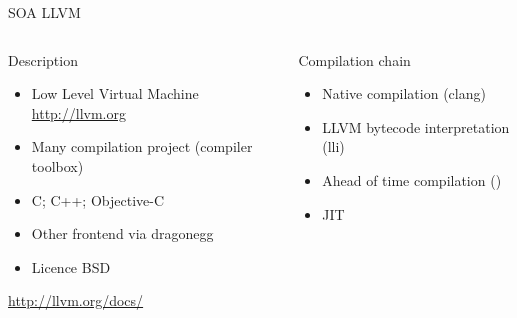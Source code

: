 %
\begin{Frame}{SOA LLVM}
  \begin{columns}[t]
    \begin{column}{\BW} %
      \begin{block}{Description}
        \begin{itemize}
        \item Low Level Virtual Machine \url{http://llvm.org}
        \item Many compilation project (compiler toolbox)
        \item C; C++; Objective-C
        \item Other frontend via dragonegg
        \item Licence BSD
        \end{itemize}
      \end{block} 
\href{http://llvm.org/docs/}{http://llvm.org/docs/}
    \end{column}
    
    \begin{column}{\BW} %
      \begin{block}{Compilation chain}
        \begin{itemize}
        \item Native compilation (clang)
        \item LLVM bytecode interpretation (lli)
        \item Ahead of time compilation ()
        \item JIT
        \end{itemize}
      \end{block}   
    \end{column}
  \end{columns}  
\end{Frame}


